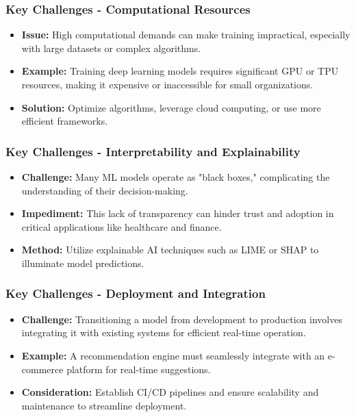 \documentclass[aspectratio=169]{beamer}
\begin{document}
\begin{frame}[fragile]
    \frametitle{Key Challenges - Computational Resources}
    \begin{itemize}
        \item \textbf{Issue:} High computational demands can make training impractical, especially with large datasets or complex algorithms.
        \item \textbf{Example:} Training deep learning models requires significant GPU or TPU resources, making it expensive or inaccessible for small organizations.
        \item \textbf{Solution:} Optimize algorithms, leverage cloud computing, or use more efficient frameworks.
    \end{itemize}
\end{frame}

\begin{frame}[fragile]
    \frametitle{Key Challenges - Interpretability and Explainability}
    \begin{itemize}
        \item \textbf{Challenge:} Many ML models operate as "black boxes," complicating the understanding of their decision-making.
        \item \textbf{Impediment:} This lack of transparency can hinder trust and adoption in critical applications like healthcare and finance.
        \item \textbf{Method:} Utilize explainable AI techniques such as LIME or SHAP to illuminate model predictions.
    \end{itemize}
\end{frame}

\begin{frame}[fragile]
    \frametitle{Key Challenges - Deployment and Integration}
    \begin{itemize}
        \item \textbf{Challenge:} Transitioning a model from development to production involves integrating it with existing systems for efficient real-time operation.
        \item \textbf{Example:} A recommendation engine must seamlessly integrate with an e-commerce platform for real-time suggestions.
        \item \textbf{Consideration:} Establish CI/CD pipelines and ensure scalability and maintenance to streamline deployment.
    \end{itemize}
\end{frame}
\end{document}
